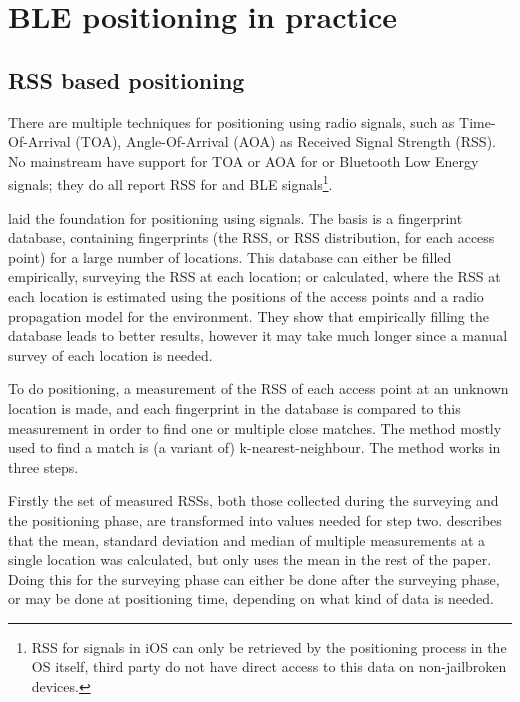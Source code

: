 \chapter{BLE positioning in practice}
\label{chap:architecture}


\section{RSS based positioning}
\label{sec:architecture-rss-based-positioning}
There are multiple techniques for positioning using radio signals, such as Time-Of-Arrival (TOA), Angle-Of-Arrival (AOA) as Received Signal Strength (RSS).
No mainstream \devices have support for TOA or AOA for \wifi or Bluetooth Low Energy signals; they do all report RSS for \wifi and BLE signals\footnote{RSS for \wifi signals in iOS can only be retrieved by the positioning process in the OS itself, third party \apps do not have direct access to this data on non-jailbroken devices.}.

\citet{bahl2000radar} laid the foundation for positioning using \wifi signals.
The basis is a fingerprint database, containing fingerprints (the RSS, or RSS distribution, for each access point) for a large number of locations.
This database can either be filled empirically, surveying the RSS at each location; or calculated, where the RSS at each location is estimated using the positions of the access points and a radio propagation model for the environment.
They show that empirically filling the database leads to better results, however it may take much longer since a manual survey of each location is needed.

To do positioning, a measurement of the RSS of each access point at an unknown location is made, and each fingerprint in the database is compared to this measurement in order to find one or multiple close matches.
The method mostly used to find a match is (a variant of) k-nearest-neighbour.
The method works in three steps.

Firstly the set of measured RSSs, both those collected during the surveying and the positioning phase, are transformed into values needed for step two.
\citet{bahl2000radar} describes that the mean, standard deviation and median of multiple measurements at a single location was calculated, but only uses the mean in the rest of the paper.
Doing this for the surveying phase can either be done after the surveying phase, or may be done at positioning time, depending on what kind of data is needed.

